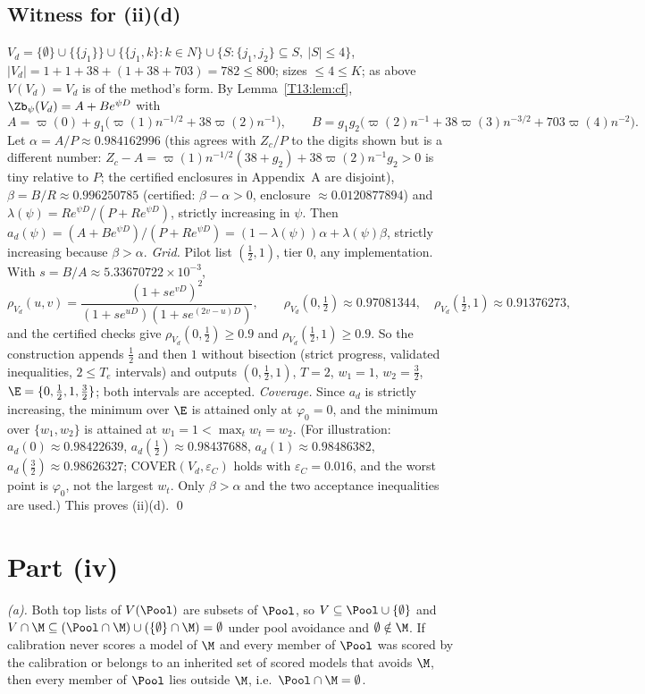 \documentclass[11pt]{report}
\begin{document}
\subsection{Witness for (ii)(d)}
$V_d=\{\emptyset\}\cup\{\{j_1\}\}\cup\{\{j_1,k\}:k\in N\}\cup\{S:\{j_1,j_2\}\subseteq S,\ |S|\le4\}$, $|V_d|=1+1+38+(1+38+703)=782\le800$; sizes $\le4\le K$; as above $V(V_d)=V_d$ is of the method's form. By Lemma~\ref{T13:lem:cf}, $\Zb_\psi(V_d)=A+Be^{\psi D}$ with
\[
A=\varpi(0)+g_1\bigl(\varpi(1)n^{-1/2}+38\varpi(2)n^{-1}\bigr),\qquad
B=g_1g_2\bigl(\varpi(2)n^{-1}+38\varpi(3)n^{-3/2}+703\varpi(4)n^{-2}\bigr).
\]
Let $\alpha=A/P\approx0.984162996$ (this agrees with $Z_c/P$ to the digits shown but is a different number: $Z_c-A=\varpi(1)n^{-1/2}(38+g_2)+38\varpi(2)n^{-1}g_2>0$ is tiny relative to $P$; the certified enclosures in Appendix~A are disjoint), $\beta=B/R\approx0.996250785$ (certified: $\beta-\alpha>0$, enclosure $\approx0.0120877894$) and $\lambda(\psi)=Re^{\psi D}/(P+Re^{\psi D})$, strictly increasing in $\psi$. Then
$a_d(\psi)=(A+Be^{\psi D})/(P+Re^{\psi D})=(1-\lambda(\psi))\alpha+\lambda(\psi)\beta$, strictly increasing because $\beta>\alpha$.
\emph{Grid.} Pilot list $(\tfrac12,1)$, tier $0$, any implementation. With $s=B/A\approx5.33670722\times10^{-3}$,
\[
\rho_{V_d}(u,v)=\frac{(1+se^{vD})^2}{(1+se^{uD})(1+se^{(2v-u)D})},\qquad
\rho_{V_d}(0,\tfrac12)\approx0.97081344,\quad \rho_{V_d}(\tfrac12,1)\approx0.91376273,
\]
and the certified checks give $\rho_{V_d}(0,\tfrac12)\ge0.9$ and $\rho_{V_d}(\tfrac12,1)\ge0.9$. So the construction appends $\tfrac12$ and then $1$ without bisection (strict progress, validated inequalities, $2\le T_e$ intervals) and outputs $(0,\tfrac12,1)$, $T=2$, $w_1=1$, $w_2=\tfrac32$, $\E=\{0,\tfrac12,1,\tfrac32\}$; both intervals are accepted.
\emph{Coverage.} Since $a_d$ is strictly increasing, the minimum over $\E$ is attained only at $\varphi_0=0$, and the minimum over $\{w_1,w_2\}$ is attained at $w_1=1<\max_tw_t=w_2$. (For illustration: $a_d(0)\approx0.98422639$, $a_d(\tfrac12)\approx0.98437688$, $a_d(1)\approx0.98486382$, $a_d(\tfrac32)\approx0.98626327$; COVER$(V_d,\varepsilon_C)$ holds with $\varepsilon_C=0.016$, and the worst point is $\varphi_0$, not the largest $w_t$. Only $\beta>\alpha$ and the two acceptance inequalities are used.) This proves (ii)(d). \qed

\section{Part (iv)}
\emph{(a).} Both top lists of $V(\Pool)$ are subsets of $\Pool$, so $V\subseteq\Pool\cup\{\emptyset\}$ and $V\cap\M\subseteq(\Pool\cap\M)\cup(\{\emptyset\}\cap\M)=\emptyset$ under pool avoidance and $\emptyset\notin\M$. If calibration never scores a model of $\M$ and every member of $\Pool$ was scored by the calibration or belongs to an inherited set of scored models that avoids $\M$, then every member of $\Pool$ lies outside $\M$, i.e.\ $\Pool\cap\M=\emptyset$.
\end{document}
